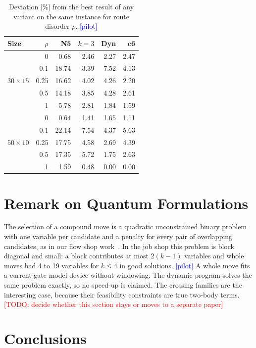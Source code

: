 \documentclass[10pt,twocolumn]{article}
\newcommand{\todo}[1]{\textcolor{red}{[TODO: #1]}}
\newcommand{\pilot}{\textcolor{blue}{[pilot]}}
\begin{document}
\begin{table}[t]
\centering\small
\begin{tabular}{@{}lrrrrr@{}}
\toprule
Size & $\rho$ & N5 & $k{=}3$ & Dyn & c6 \\
\midrule
\multirow{5}{*}{$30\times15$}
 & 0    & 0.68  & 2.46 & 2.27 & 2.47 \\
 & 0.1  & 18.74 & 3.39 & 7.52 & 4.13 \\
 & 0.25 & 16.62 & 4.02 & 4.26 & 2.20 \\
 & 0.5  & 14.18 & 3.85 & 4.28 & 2.61 \\
 & 1    & 5.78  & 2.81 & 1.84 & 1.59 \\
\midrule
\multirow{5}{*}{$50\times10$}
 & 0    & 0.64  & 1.41 & 1.65 & 1.11 \\
 & 0.1  & 22.14 & 7.54 & 4.37 & 5.63 \\
 & 0.25 & 17.75 & 4.58 & 2.69 & 4.39 \\
 & 0.5  & 17.35 & 5.72 & 1.75 & 2.63 \\
 & 1    & 1.59  & 0.48 & 0.00 & 0.00 \\
\bottomrule
\end{tabular}
\caption{Deviation [\%] from the best result of any variant on the same
instance for route disorder $\rho$. \pilot}
\label{tab:rho}
\end{table}

\section{Remark on Quantum Formulations}

The selection of a compound move is a quadratic unconstrained binary
problem with one variable per candidate and a penalty for every pair of
overlapping candidates, as in our flow shop work~\cite{windowed_own}. In
the job shop this problem is block diagonal and small: a block
contributes at most $2(k-1)$ variables and whole moves had 4 to 19
variables for $k\le4$ in good solutions. \pilot{} A whole move fits a
current gate-model device without windowing. The dynamic program solves
the same problem exactly, so no speed-up is claimed. The crossing
families are the interesting case, because their feasibility constraints
are true two-body terms. \todo{decide whether this section stays or moves
to a separate paper}

\section{Conclusions}
\end{document}
